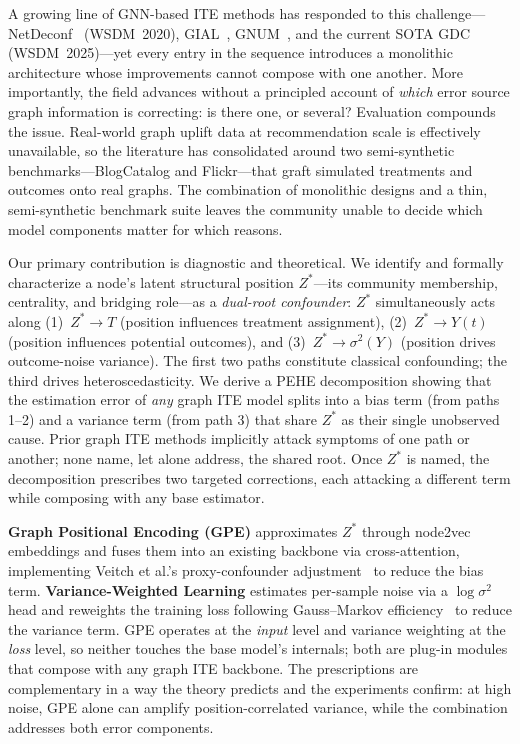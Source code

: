 \documentclass[sigconf,anonymous,review]{acmart}
\begin{document}
A growing line of GNN-based ITE methods has responded to this challenge---NetDeconf~\cite{guo2020learning} (WSDM~2020), GIAL~\cite{chu2021graph}, GNUM~\cite{zhu2023gnum}, and the current SOTA GDC~\cite{hu2025gdc} (WSDM~2025)---yet every entry in the sequence introduces a monolithic architecture whose improvements cannot compose with one another. More importantly, the field advances without a principled account of \emph{which} error source graph information is correcting: is there one, or several? Evaluation compounds the issue. Real-world graph uplift data at recommendation scale is effectively unavailable, so the literature has consolidated around two semi-synthetic benchmarks---BlogCatalog and Flickr---that graft simulated treatments and outcomes onto real graphs. The combination of monolithic designs and a thin, semi-synthetic benchmark suite leaves the community unable to decide which model components matter for which reasons.

Our primary contribution is diagnostic and theoretical. We identify and formally characterize a node's latent structural position $Z^*$---its community membership, centrality, and bridging role---as a \emph{dual-root confounder}: $Z^*$ simultaneously acts along (1)~$Z^* \to T$ (position influences treatment assignment), (2)~$Z^* \to Y(t)$ (position influences potential outcomes), and (3)~$Z^* \to \sigma^2(Y)$ (position drives outcome-noise variance). The first two paths constitute classical confounding; the third drives heteroscedasticity. We derive a PEHE decomposition showing that the estimation error of \emph{any} graph ITE model splits into a bias term (from paths 1--2) and a variance term (from path 3) that share $Z^*$ as their single unobserved cause. Prior graph ITE methods implicitly attack symptoms of one path or another; none name, let alone address, the shared root. Once $Z^*$ is named, the decomposition prescribes two targeted corrections, each attacking a different term while composing with any base estimator.

\textbf{Graph Positional Encoding (GPE)} approximates $Z^*$ through node2vec embeddings and fuses them into an existing backbone via cross-attention, implementing Veitch et al.'s proxy-confounder adjustment~\cite{veitch2019using} to reduce the bias term. \textbf{Variance-Weighted Learning} estimates per-sample noise via a $\log\sigma^2$ head and reweights the training loss following Gauss--Markov efficiency~\cite{Aitken_1936} to reduce the variance term. GPE operates at the \emph{input} level and variance weighting at the \emph{loss} level, so neither touches the base model's internals; both are plug-in modules that compose with any graph ITE backbone. The prescriptions are complementary in a way the theory predicts and the experiments confirm: at high noise, GPE alone can amplify position-correlated variance, while the combination addresses both error components.
\end{document}
